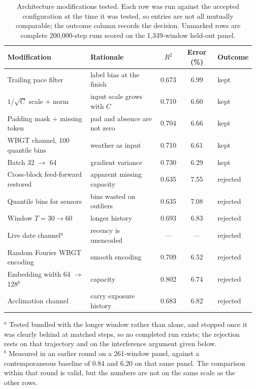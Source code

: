 \begin{table}[!ht]
\centering
\small
\caption{Architecture modifications tested. Each row was run against the accepted configuration at
the time it was tested, so entries are not all mutually comparable; the outcome column records the
decision. Unmarked rows are complete 200{,}000-step runs scored on the 1{,}349-window held-out panel.}
\label{tab:ablations}
\begin{tabular}{@{}llcc l@{}}
\toprule
Modification & Rationale & $R^2$ & Error (\%) & Outcome \\
\midrule
Trailing pace filter        & label bias at the finish   & 0.673 & 6.99 & kept \\
$1/\sqrt{C}$ scale $+$ norm & input scale grows with $C$ & 0.710 & 6.60 & kept \\
Padding mask $+$ missing token & pad and absence are not zero & 0.704 & 6.66 & kept \\
WBGT channel, 100 quantile bins & weather as input       & 0.710 & 6.61 & kept \\
Batch 32 $\rightarrow$ 64   & gradient variance          & 0.730 & 6.29 & kept \\[2pt]
Cross-block feed-forward restored & apparent missing capacity & 0.635 & 7.55 & rejected \\
Quantile bins for sensors   & bins wasted on outliers    & 0.635 & 7.08 & rejected \\
Window $T = 30 \rightarrow 60$ & longer history          & 0.693 & 6.83 & rejected \\
Live date channel$^{a}$     & recency is unencoded       & ---   & ---  & rejected \\
Random Fourier WBGT encoding & smooth encoding           & 0.709 & 6.52 & rejected \\
Embedding width 64 $\rightarrow$ 128$^{b}$ & capacity    & 0.802 & 6.74 & rejected \\
Acclimation channel         & carry exposure history     & 0.683 & 6.82 & rejected \\
\bottomrule
\end{tabular}

\vspace{2pt}
\begin{minipage}{0.92\linewidth}\footnotesize
$^{a}$ Tested bundled with the longer window rather than alone, and stopped once it was clearly
behind at matched steps, so no completed run exists; the rejection rests on that trajectory and on
the interference argument given below.\\
$^{b}$ Measured in an earlier round on a 261-window panel, against a contemporaneous baseline of
0.84 and 6.20 on that same panel. The comparison within that round is valid, but the numbers are not
on the same scale as the other rows.
\end{minipage}
\end{table}

